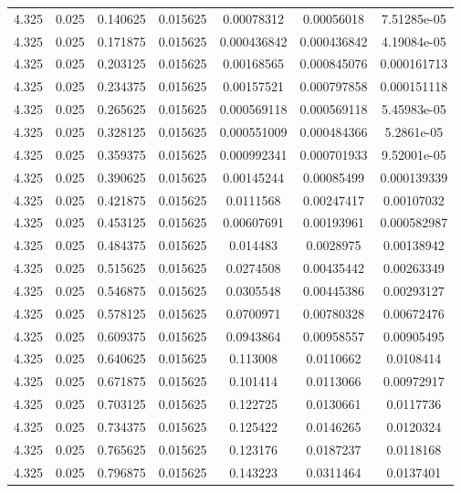 \begin{table}[bh]
\begin{center}
{\begin{tabular}{ccccccc}
4.325	 & 0.025 & 	0.140625	 & 0.015625	 & 0.00078312	 & 0.00056018	 & 7.51285e-05 \\ 
4.325	 & 0.025 & 	0.171875	 & 0.015625	 & 0.000436842	 & 0.000436842	 & 4.19084e-05 \\ 
4.325	 & 0.025 & 	0.203125	 & 0.015625	 & 0.00168565	 & 0.000845076	 & 0.000161713 \\ 
4.325	 & 0.025 & 	0.234375	 & 0.015625	 & 0.00157521	 & 0.000797858	 & 0.000151118 \\ 
4.325	 & 0.025 & 	0.265625	 & 0.015625	 & 0.000569118	 & 0.000569118	 & 5.45983e-05 \\ 
4.325	 & 0.025 & 	0.328125	 & 0.015625	 & 0.000551009	 & 0.000484366	 & 5.2861e-05 \\ 
4.325	 & 0.025 & 	0.359375	 & 0.015625	 & 0.000992341	 & 0.000701933	 & 9.52001e-05 \\ 
4.325	 & 0.025 & 	0.390625	 & 0.015625	 & 0.00145244	 & 0.00085499	 & 0.000139339 \\ 
4.325	 & 0.025 & 	0.421875	 & 0.015625	 & 0.0111568	 & 0.00247417	 & 0.00107032 \\ 
4.325	 & 0.025 & 	0.453125	 & 0.015625	 & 0.00607691	 & 0.00193961	 & 0.000582987 \\ 
4.325	 & 0.025 & 	0.484375	 & 0.015625	 & 0.014483	 & 0.0028975	 & 0.00138942 \\ 
4.325	 & 0.025 & 	0.515625	 & 0.015625	 & 0.0274508	 & 0.00435442	 & 0.00263349 \\ 
4.325	 & 0.025 & 	0.546875	 & 0.015625	 & 0.0305548	 & 0.00445386	 & 0.00293127 \\ 
4.325	 & 0.025 & 	0.578125	 & 0.015625	 & 0.0700971	 & 0.00780328	 & 0.00672476 \\ 
4.325	 & 0.025 & 	0.609375	 & 0.015625	 & 0.0943864	 & 0.00958557	 & 0.00905495 \\ 
4.325	 & 0.025 & 	0.640625	 & 0.015625	 & 0.113008	 & 0.0110662	 & 0.0108414 \\ 
4.325	 & 0.025 & 	0.671875	 & 0.015625	 & 0.101414	 & 0.0113066	 & 0.00972917 \\ 
4.325	 & 0.025 & 	0.703125	 & 0.015625	 & 0.122725	 & 0.0130661	 & 0.0117736 \\ 
4.325	 & 0.025 & 	0.734375	 & 0.015625	 & 0.125422	 & 0.0146265	 & 0.0120324 \\ 
4.325	 & 0.025 & 	0.765625	 & 0.015625	 & 0.123176	 & 0.0187237	 & 0.0118168 \\ 
4.325	 & 0.025 & 	0.796875	 & 0.015625	 & 0.143223	 & 0.0311464	 & 0.0137401 \\ 

\end{tabular}}
\end{center}
\end{table}

